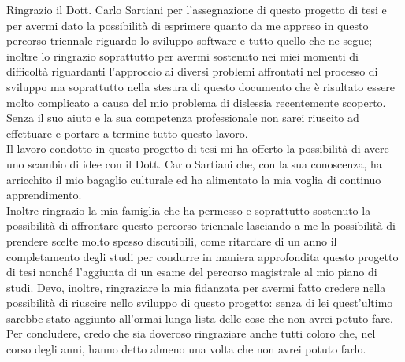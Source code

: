 \documentclass[11pt, a4paper, titlepage]{toptesi}
\makeatletter
\theoremstyle{definition}
\newcommand\listofcodes{%
 \iffrontmatter\else\frontmattertrue\fi
 \if@openright\cleardoublepage\else\clearpage\fi
 \begingroup\def\chapter##1{\@schapter}
 \phantomsection %
 \lstlistoflistings
 \endgroup
}
\makeatother
\begin{document}









\ringraziamenti
Ringrazio il Dott. Carlo Sartiani per l'assegnazione di questo progetto di tesi e per avermi dato la possibilità di esprimere quanto da me appreso in questo percorso triennale riguardo lo sviluppo software e tutto quello che ne segue; inoltre lo ringrazio soprattutto per avermi sostenuto nei miei momenti di difficoltà riguardanti l'approccio ai diversi problemi affrontati nel processo di sviluppo ma soprattutto nella stesura di questo documento che è risultato essere molto complicato a causa del mio problema di dislessia recentemente scoperto.
Senza il suo aiuto e la sua competenza professionale non sarei riuscito ad effettuare e portare a termine tutto questo lavoro.\\
Il lavoro condotto in questo progetto di tesi mi ha offerto la possibilità di avere uno scambio di idee con il Dott. Carlo Sartiani che, con la sua conoscenza, ha arricchito il mio bagaglio culturale ed ha alimentato la mia voglia di continuo apprendimento.\\
Inoltre ringrazio la mia famiglia che ha permesso e soprattutto sostenuto la possibilità di affrontare questo percorso triennale lasciando a me la possibilità di prendere scelte molto spesso discutibili, come ritardare di un anno il completamento degli studi per condurre in maniera approfondita questo progetto di tesi nonché l'aggiunta di un esame del percorso magistrale al mio piano di studi. Devo, inoltre, ringraziare la mia fidanzata per avermi fatto credere nella possibilità di riuscire nello sviluppo di questo progetto: senza di lei quest'ultimo sarebbe stato aggiunto all'ormai lunga lista delle cose che non avrei potuto fare.\\
Per concludere, credo che sia doveroso ringraziare anche tutti coloro  che, nel corso degli anni, hanno detto almeno una volta che non avrei potuto farlo.


\appendix




\listoffigures

\listoftables

\listofcodes


{}
\nocite{*}
\printbibliography
\end{document}
